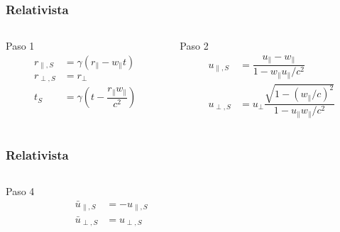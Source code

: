 \documentclass{beamer}
\begin{document}
\begin{frame}[t]
    \frametitle[prueb1]{Relativista}
    \begin{columns}
        \begin{column}{0.5\textwidth}
            \begin{block}{Paso 1}
                \begin{align*}
                    r_{\parallel,S} &= \gamma\left( r_\parallel - w_\parallel t \right) \nonumber\\
                    r_{\perp, S} &= r_\perp  \\
                    t_S &= \gamma\left( t - \dfrac{r_\parallel w_\parallel}{c^2} \right) \nonumber
                \end{align*}
                \vspace{5.5mm}
            \end{block}
        \end{column}
        \begin{column}{0.5\textwidth}
            \begin{block}{Paso 2}
                \begin{align*}
                    u_{\parallel,S} &= \dfrac{u_\parallel - w_\parallel}{1 - w_\parallel u_\parallel / c^2} \\[5mm]
                    u_{\perp,S} &= u_\perp\dfrac{\sqrt{1 - {(w_\parallel/c)}^2}}{1 - u_\parallel w_\parallel / c^2} 
                \end{align*}
            \end{block}
        \end{column}
    \end{columns}
\end{frame}

\begin{frame}[t]
    \frametitle[prueb1]{Relativista}
    \begin{columns}
        \begin{column}{0.5\textwidth}
            \begin{block}{Paso 4}
                \begin{align*}
                    \bar{u}_{\parallel, S} &= -u_{\parallel, S} \\[9.5mm]
                    \bar{u}_{\perp, S} &= u_{\perp, S}
                \end{align*}
                \vspace{2.2mm}
            \end{block}
        \end{column}
        \begin{column}{0.5\textwidth}
        \end{column}
    \end{columns}
\end{frame}
\end{document}

